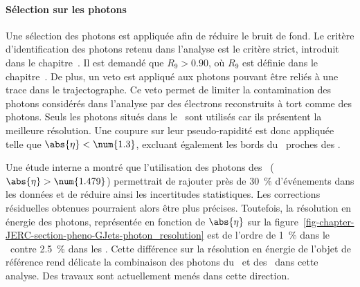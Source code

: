 \paragraph{Sélection sur les photons}
Une sélection des photons est appliquée afin de réduire le bruit de fond.
Le critère d'identification des photons retenu dans l'analyse est le critère strict, introduit dans le chapitre~.
Il est demandé que $R_9 > \num{0.90}$, où $R_9$ est définie dans le chapitre~.
De plus, un veto est appliqué aux photons pouvant être reliés à une trace dans le trajectographe.
Ce veto permet de limiter la contamination des photons considérés dans l'analyse par des électrons reconstruits à tort comme des photons.
Seuls les photons situés dans le \CMSbarrel\ sont utilisés car ils présentent la meilleure résolution.
Une coupure sur leur pseudo-rapidité est donc appliquée telle que $\abs{\eta} < \num{1.3}$, excluant également les bords du \CMSbarrel\ proches des \CMSendcaps.
\par Une étude interne a montré que l'utilisation des photons des \CMSendcaps\ ($\abs{\eta} > \num{1.479}$) permettrait de rajouter près de \SI{30}{\%} d'événements dans les données et de réduire ainsi les incertitudes statistiques.
Les corrections résiduelles obtenues pourraient alors être plus précises.
Toutefois, la résolution en énergie des photons, représentée en fonction de $\abs{\eta}$ sur la figure~\ref{fig-chapter-JERC-section-pheno-GJets-photon_resolution} est de l'ordre de \SI{1}{\%} dans le \CMSbarrel\ contre \SI{2.5}{\%} dans les \CMSendcaps.
Cette différence sur la résolution en énergie de l'objet de référence rend délicate la combinaison des photons du \CMSbarrel\ et des \CMSendcaps\ dans cette analyse.
Des travaux sont actuellement menés dans cette direction.
